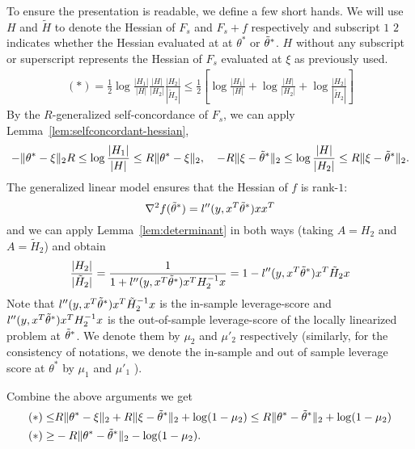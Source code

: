 	
	To ensure the presentation is readable, we define a few short hands. We will use $H$ and $\tilde{H}$ to denote the Hessian of $F_s$ and $F_s +  f$ respectively and subscript $1$ $2$ indicates whether the Hessian evaluated at at $\theta^*$ or $\tilde{\theta}^*$. $H$ without any subscript or superscript represents the Hessian of $F_s$ evaluated at $\xi$ as previously used.
	\begin{align*}
	(*)  = \frac{1}{2} \log  \frac{|H_1|}{ |H| }\frac{|H|}{|H_2|}\frac{|H_2|}{|\tilde{H}_2|}  \leq \frac{1}{2}\left[  	\log\frac{|H_1|}{ |H| }  + \log \frac{|H|}{|H_2|} + \log\frac{|H_2|}{|\tilde{H}_2|}\right]
	\end{align*}
	By the $R$-generalized self-concordance of $F_s$, we can apply Lemma~\ref{lem:selfconcordant-hessian}, 
	$$
-\|\theta^*-\xi\|_2R\leq \log\frac{|H_1|}{ |H| } \leq R\|\theta^*-\xi\|_2, \quad   -R\|\xi - \tilde{\theta}^*\|_2\leq \log\frac{|H|}{ |H_2| } \leq R\|\xi - \tilde{\theta}^*\|_2.
	$$
	The generalized linear model ensures that the Hessian of $f$ is rank-$1$:
	$$\nabla^2 f(\tilde{\theta}^*) =  l''(y,x^T\tilde{\theta}^*)  xx^T$$
	and we can apply Lemma~\ref{lem:determinant} in both ways (taking $A=H_2$ and $A=\tilde{H}_2$) and obtain
	$$
	\frac{|H_2|}{|\tilde{H}_2|}   =  \frac{1}{1 + l''(y,x^T\tilde{\theta}^*)x^T H_2^{-1}  x}  =  1- l''(y,x^T\tilde{\theta}^*)x^T\tilde{H}_2 x
	$$
	Note that $ l''(y,x^T\tilde{\theta}^*)x^T\tilde{H}_2^{-1} x$ is the in-sample leverage-score and $ l''(y,x^T\tilde{\theta}^*)x^T H_2^{-1}  x$ is the out-of-sample leverage-score of the locally linearized problem at $\tilde{\theta}^*$. We denote them by $\mu_2$ and $\mu'_2$ respectively (similarly, for the consistency of notations, we denote the in-sample and out of sample leverage score at $\theta^*$ by $\mu_1$ and $\mu'_1$ ). %
	
Combine the above arguments we get
	\begin{align}\label{eq:der_part1}
	   (*)\leq&  R\|\theta^*-\xi\|_2 + R\|\xi - \tilde{\theta}^*\|_2  + \log (1 - \mu_2) \leq R\|\theta^*-\tilde{\theta}^*\|_2 + \log(1-\mu_2)\\
	   (*) \geq& -R\|\theta^*-\tilde{\theta}^*\|_2  - \log(1-\mu_2).
	\end{align}
	
